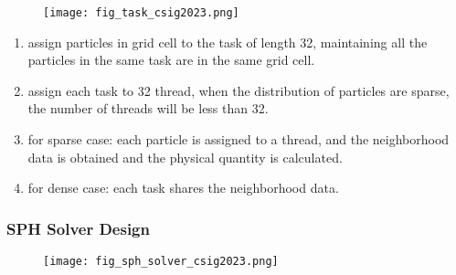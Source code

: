 \begin{frame}
    \begin{figure}[H]
        \centering
        \texttt{[image: fig\_task\_csig2023.png]}
    \end{figure}
    \begin{enumerate}
        \item assign particles in grid cell to the task of length 32, maintaining all the particles in the same task are in the same grid cell.
        \item assign each task to 32 thread, when the distribution of particles are sparse, the number of threads will be less than 32.
        \item for sparse case: each particle is assigned to a thread, and the neighborhood data is obtained and the physical quantity is calculated.
        \item for dense case: each task shares the neighborhood data.
    \end{enumerate}
\end{frame}

\begin{frame}
    \frametitle{SPH Solver Design}
    \begin{figure}[H]
        \centering
        \texttt{[image: fig\_sph\_solver\_csig2023.png]}
    \end{figure}
\end{frame}

